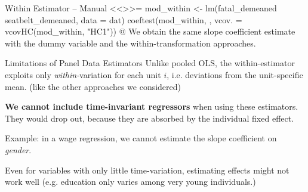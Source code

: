 \documentclass[11pt, aspectratio = 169]{beamer}
\begin{document}
\begin{frame}[fragile]{Within Estimator -- Manual}
\footnotesize
<<>>=
mod_within <- lm(fatal_demeaned ~ seatbelt_demeaned, data = dat) 
coeftest(mod_within, , vcov. = vcovHC(mod_within, "HC1"))
@
\small
We obtain the same slope coefficient estimate with the dummy variable and the within-transformation approaches.
\end{frame}





\begin{frame}{Limitations of Panel Data Estimators}
Unlike pooled OLS, %
 the within-estimator exploits only \textit{within-}variation for each unit $i$, i.e. deviations from the unit-specific mean. (like the other approaches we considered)

\alert{\textbf{We cannot include time-invariant regressors}} when using these estimators.   They would drop out, because they are absorbed by the individual fixed effect.

Example: in a wage regression, we cannot estimate the slope coefficient on \textit{gender}. 

Even for variables with only little  time-variation, estimating effects might not work well (e.g. education only varies among very young individuals.) 
\end{frame}
\end{document}
